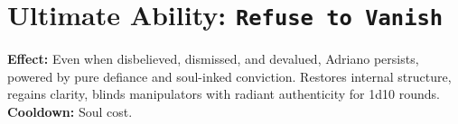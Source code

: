 \documentclass{article}
\begin{document}
\vspace{0.5cm}

\section*{Ultimate Ability: \texttt{Refuse to Vanish}}

\noindent
\textbf{Effect:} Even when disbelieved, dismissed, and devalued, Adriano persists, powered by pure defiance and soul-inked conviction. Restores internal structure, regains clarity, blinds manipulators with radiant authenticity for 1d10 rounds.\\
\textbf{Cooldown:} Soul cost.
\end{document}
